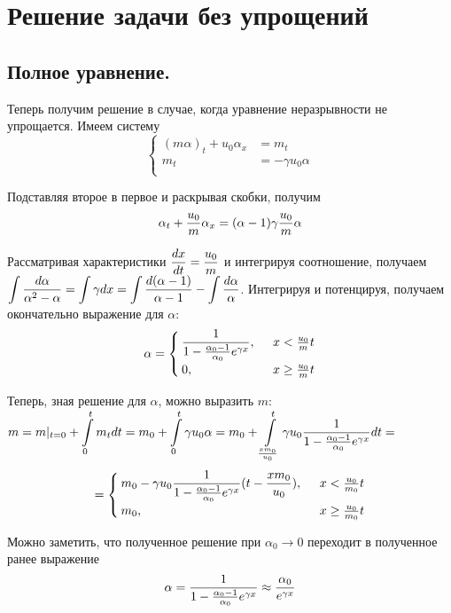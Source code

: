 \section{Решение задачи без упрощений}
\subsection{Полное уравнение.}
\par Теперь получим решение в случае, когда уравнение неразрывности не упрощается. Имеем систему 
\begin{equation*}
\begin{cases}
(m\alpha)_{t}+u_{0}\alpha_{x}&= m_{t}\\
m_{t}&= -\gamma u_{0}\alpha\\
\end{cases}
\end{equation*}
\par Подставляя второе в первое и раскрывая скобки, получим $$\displaystyle \alpha_{t}+\frac{u_{0}}{m}\alpha_{x}=(\alpha-1)\gamma\frac{u_{0}}{m}\alpha$$
\par Рассматривая характеристики $\displaystyle \frac{dx}{dt}=\frac{u_{0}}{m}$ и интегрируя соотношение, получаем $\displaystyle \int \frac{d\alpha}{\alpha^{2}-\alpha}=\int\gamma dx=\int\frac{d(\alpha-1)}{\alpha-1}-\int\frac{d\alpha}{\alpha}$. Интегрируя и потенцируя, получаем окончательно выражение для $\alpha$:
\begin{equation*}
\displaystyle
\alpha=
\begin{cases}
\displaystyle
\frac{1}{1-\frac{\alpha_{0}-1}{\alpha_{0}}e^{\gamma x}},\;\;& x<\frac{u_{0}}{m}t\\
0,\;\;& x\geq \frac{u_{0}}{m}t\\
\end{cases}
\end{equation*}

\par Теперь, зная решение для $\alpha$, можно выразить $m$: $ \displaystyle
m= m|_{t=0}+\int\limits^{t}_{0}m_{t}dt=m_{0}+\int\limits^{t}_{0}\gamma u_{0}\alpha=m_{0}+\int\limits^{t}_{\frac{xm_{0}}{u_{0}}}\gamma u_{0}\frac{1}{1-\frac{\alpha_{0}-1}{\alpha_{0}}e^{\gamma x}} dt=$
\begin{equation*}
=
\begin{cases}
\displaystyle
m_{0}-\gamma u_{0}\frac{1}{1-\frac{\alpha_{0}-1}{\alpha_{0}}e^{\gamma x}}(t-\frac{xm_{0}}{u_{0}}),\;\;& x<\frac{u_{0}}{m_{0}}t\\
m_{0},\;\;& x\geq \frac{u_{0}}{m_{0}}t\\
\end{cases}
\end{equation*}

\par Можно заметить, что полученное решение при $\alpha_{0} \rightarrow 0$ переходит в полученное ранее выражение $$\displaystyle \alpha=\frac{1}{1-\frac{\alpha_{0}-1}{\alpha_{0}}e^{\gamma x}}\approx\frac{\alpha_{0}}{e^{\gamma x}}$$
